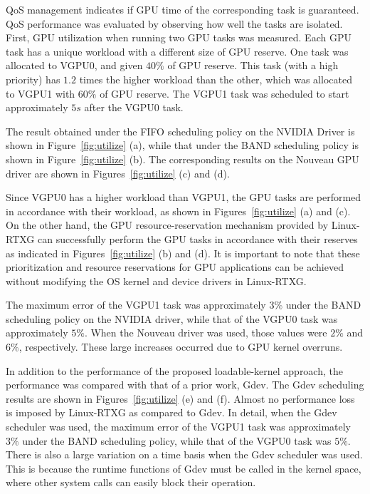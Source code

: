 QoS management indicates if GPU time of the corresponding task is guaranteed.
QoS performance was evaluated by observing how well the tasks are isolated.
First, GPU utilization when running two GPU tasks was measured.
Each GPU task has a unique workload with a different size of GPU reserve.
One task was allocated to VGPU0, and given $40\%$ of GPU reserve.
This task (with a high priority) has $1.2$ times the higher workload than the other, which was allocated to VGPU1 with $60\%$ of GPU reserve.
The VGPU1 task was scheduled to start approximately $5s$ after the VGPU0 task.


The result obtained under the FIFO scheduling policy on the NVIDIA Driver is shown in Figure~\ref{fig:utilize} (a), while that under the BAND scheduling policy is shown in Figure~\ref{fig:utilize} (b).
The corresponding results on the Nouveau GPU driver are shown in Figures~\ref{fig:utilize} (c) and (d).


Since VGPU0 has a higher workload than VGPU1, the GPU tasks are performed in accordance with their workload, as shown in Figures~\ref{fig:utilize} (a) and (c).
On the other hand, the GPU resource-reservation mechanism provided by Linux-RTXG can successfully perform the GPU tasks in accordance with their reserves as indicated in Figures~\ref{fig:utilize} (b) and (d).
It is important to note that these prioritization and resource reservations for GPU applications can be achieved without modifying the OS kernel and device drivers in Linux-RTXG.


The maximum error of the VGPU1 task was approximately $3\%$ under the BAND scheduling policy on the NVIDIA driver, while that of the VGPU0 task was approximately $5\%$.
When the Nouveau driver was used, those values were $2\%$ and $6\%$, respectively.
These large increases occurred due to GPU kernel overruns.


In addition to the performance of the proposed loadable-kernel approach, the performance was compared with that of a prior work, Gdev.
The Gdev scheduling results are shown in Figures~\ref{fig:utilize} (e) and (f).
Almost no performance loss is imposed by Linux-RTXG as compared to Gdev.
In detail, when the Gdev scheduler was used, the maximum error of the VGPU1 task was approximately $3\%$ under the BAND scheduling policy, while that of the VGPU0 task was $5\%$.
There is also a large variation on a time basis when the Gdev scheduler was used.
This is because the runtime functions of Gdev must be called in the kernel space, where other system calls can easily block their operation.


